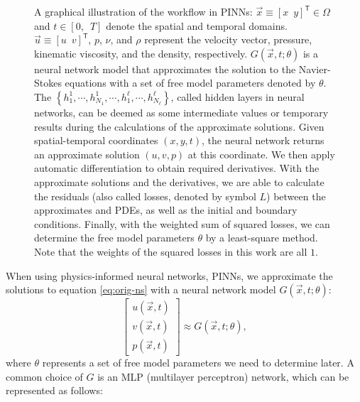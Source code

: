 \begin{figure}
    \centering
    \normalsize
    \resizebox{\textwidth}{!}{\unskip}
    \caption{
        A graphical illustration of the workflow in PINNs:
        $\vec{x} \equiv \left[ x \enspace y \right]^\mathsf{T} \in \Omega$ and $t \in \left[0,\enspace T\right]$ denote the spatial and temporal domains.
        $\vec{u} \equiv \left[ u \enspace v \right]^\mathsf{T}$, $p$, $\nu$, and $\rho$ represent the velocity vector, pressure, kinematic viscosity, and the density, respectively.
        $G(\vec{x}, t; \theta)$ is a neural network model that approximates the solution to the Navier-Stokes equations with a set of free model parameters denoted by $\theta$.
        The $\left\{h_1^1, \cdots, h_{N_1}^1, \cdots, h_1^\ell, \cdots, h_{N_\ell}^\ell\right\}$, called hidden layers in neural networks, can be deemed as some intermediate values or temporary results during the calculations of the approximate solutions.
        Given spatial-temporal coordinates $(x, y, t)$, the neural network returns an approximate solution $(u, v, p)$ at this coordinate.
        We then apply automatic differentiation to obtain required derivatives.
        With the approximate solutions and the derivatives, we are able to calculate the residuals (also called losses, denoted by symbol $L$) between the approximates and PDEs, as well as the initial and boundary conditions. 
        Finally, with the weighted sum of squared losses, we can determine the free model parameters $\theta$ by a least-square method.
        Note that the weights of the squared losses in this work are all $1$.
    }
    \label{fig:pinn-workflow}
\end{figure}

When using physics-informed neural networks, PINNs, we approximate the solutions to equation \eqref{eq:orig-ns} with a neural network model $G(\vec{x}, t; \theta)$:
\begin{equation}\label{eq:G-network}
    \begin{bmatrix}
        u(\vec{x}, t) \\ v(\vec{x}, t) \\ p(\vec{x}, t)
    \end{bmatrix}
    \approx
    G(\vec{x}, t; \theta),
\end{equation}
where $\theta$ represents a set of free model parameters we need to determine later.
A common choice of $G$ is an MLP (multilayer perceptron) network, which can be represented as follows:

